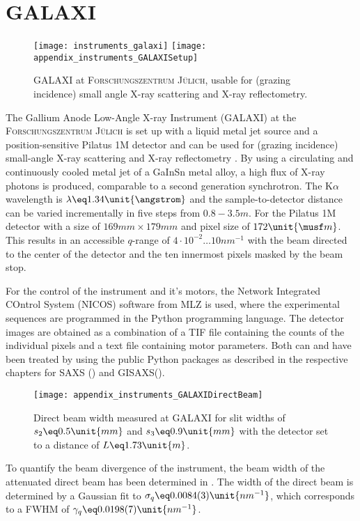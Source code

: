\documentclass[\main/dresen_thesis.tex]{subfiles}
\begin{document}
  \section{GALAXI}\label{ch:lss:galaxi}
    \begin{figure}[ht]
      \centering
      \texttt{[image: instruments\_galaxi]}
      \texttt{[image: appendix\_instruments\_GALAXISetup]}
      \caption{\label{fig:lss:galaxi}GALAXI at \textsc{Forschungszentrum J\"ulich}, usable for (grazing incidence) small angle X-ray scattering and X-ray reflectometry.}
    \end{figure}

    The Gallium Anode Low-Angle X-ray Instrument (GALAXI) at the \textsc{Forschungszentrum J\"ulich} is set up with a liquid metal jet source and a position-sensitive Pilatus 1M detector and can be used for (grazing incidence) small-angle X-ray scattering and X-ray reflectometry \cite{FZJ_2016_GALAX}.
    By using a circulating and continuously cooled metal jet of a GaInSn metal alloy, a high flux of X-ray photons is produced, comparable to a second generation synchrotron.
    The K$\alpha$ wavelength is $\lambda \eq 1.34 \unit{\angstrom}$ and the sample-to-detector distance can be varied incrementally in five steps from $0.8 - 3.5 \unit{m}$.
    For the Pilatus 1M detector with a size of $169 \unit{mm} \times 179 \unit{mm}$ and pixel size of $172 \unit{\musf m}$.
    This results in an accessible $q$-range of $4 \cdot 10^{-2} \ldots 10 \unit{nm}^{-1}$ with the beam directed to the center of the detector and the ten innermost pixels masked by the beam stop.

    For the control of the instrument and it's motors, the Network Integrated COntrol System (NICOS) software from MLZ is used, where the experimental sequences are programmed in the Python programming language. 
    The detector images are obtained as a combination of a TIF file containing the counts of the individual pixels and a text file containing motor parameters.
    Both can and have been treated by using the public Python packages as described in the respective chapters for SAXS () and GISAXS().

    \begin{figure}[ht]
      \centering
      \texttt{[image: appendix\_instruments\_GALAXIDirectBeam]}
      \caption{\label{fig:lss:galaxi:directBeam}Direct beam width measured at GALAXI for slit widths of $s_2 \eq 0.5 \unit{mm}$ and $s_3 \eq 0.9 \unit{mm}$ with the detector set to a distance of $L \eq 1.73 \unit{m}$.}
    \end{figure}
    To quantify the beam divergence of the instrument, the beam width of the attenuated direct beam has been determined in .
    The width of the direct beam is determined by a Gaussian fit to $\sigma_q \eq 0.0084(3) \unit{nm^{-1}}$, which corresponds to a FWHM of $\gamma_q \eq 0.0198(7) \unit{nm^{-1}}$.
\end{document}
